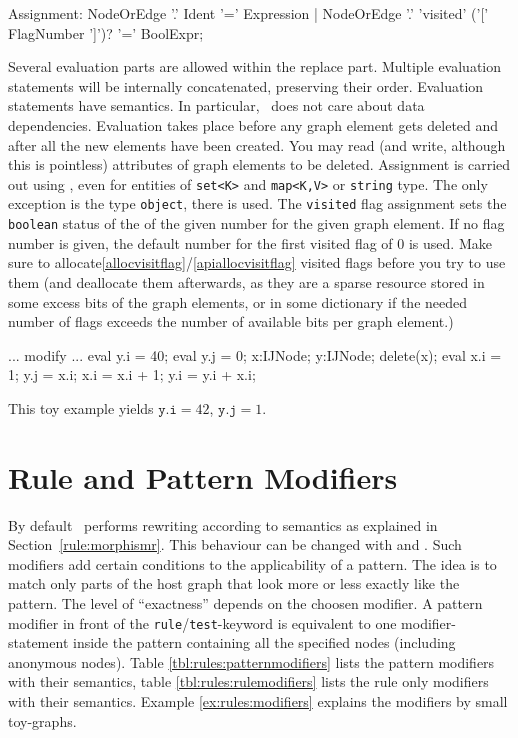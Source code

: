 \begin{rail}    
   Assignment: NodeOrEdge '.' Ident '=' Expression | NodeOrEdge '.' 'visited' ('[' FlagNumber ']')? '=' BoolExpr;
\end{rail}
Several evaluation parts are allowed within the replace part. 
Multiple evaluation statements will be internally concatenated, preserving their order.
Evaluation statements have  semantics.
In particular, \GrG\ does not care about data dependencies.
Evaluation takes place before any graph element gets deleted and after all the new elements have been created.
You may read (and write, although this is pointless) attributes of graph elements to be deleted.
Assignment is carried out using , even for entities of \verb#set<K># and \verb#map<K,V># or \texttt{string} type.
The only exception is the type \texttt{object}, there  is used.
The \texttt{visited} flag assignment sets the \texttt{boolean} status of the  of the given number for the given graph element.
If no flag number is given, the default number for the first visited flag of 0 is used.
Make sure to allocate\ref{allocvisitflag}/\ref{apiallocvisitflag} visited flags before you try to use them 
(and deallocate them afterwards, as they are a sparse resource stored in some excess bits of the graph elements, or in some dictionary if the needed number of flags exceeds the number of available bits per graph element.)

\begin{example}
\begin{grgen}
...
modify {
  ...
  eval { y.i = 40; }
  eval { y.j = 0;  }
  x:IJNode;
  y:IJNode;
  delete(x);
  eval {
    x.i = 1; 
    y.j = x.i;
    x.i = x.i + 1;
    y.i = y.i + x.i;
  }
}
\end{grgen}
This toy example yields $\texttt{y.i} = 42$, $\texttt{y.j} = 1$.
\end{example}

\section{Rule and Pattern Modifiers} 
\label{sct:patternmodifier}
By default \GrG\ performs rewriting according to  semantics as explained in Section~\ref{rule:morphismr}.
This behaviour can be changed with  and .
Such modifiers add certain conditions to the applicability of a pattern.
The idea is to match only parts of the host graph that look more or less exactly like the pattern.
The level of ``exactness'' depends on the choosen modifier.
A pattern modifier in front of the \texttt{rule}/\texttt{test}-keyword is equivalent to one modifier-statement inside the pattern containing all the specified nodes (including anonymous nodes).
Table \ref{tbl:rules:patternmodifiers} lists the pattern modifiers with their semantics, table \ref{tbl:rules:rulemodifiers} lists the rule only modifiers with their semantics.
Example \ref{ex:rules:modifiers} explains the modifiers by small toy-graphs.

